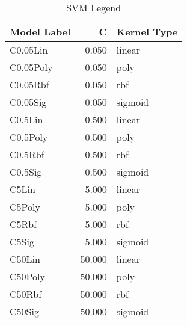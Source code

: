 \begin{table}
\centering
\caption{SVM Legend}
\label{tab:SVM_legend}
\begin{tabular}{lrl}
\toprule
Model Label & C & Kernel Type \\
\midrule
C0.05Lin & 0.050 & linear \\
C0.05Poly & 0.050 & poly \\
C0.05Rbf & 0.050 & rbf \\
C0.05Sig & 0.050 & sigmoid \\
C0.5Lin & 0.500 & linear \\
C0.5Poly & 0.500 & poly \\
C0.5Rbf & 0.500 & rbf \\
C0.5Sig & 0.500 & sigmoid \\
C5Lin & 5.000 & linear \\
C5Poly & 5.000 & poly \\
C5Rbf & 5.000 & rbf \\
C5Sig & 5.000 & sigmoid \\
C50Lin & 50.000 & linear \\
C50Poly & 50.000 & poly \\
C50Rbf & 50.000 & rbf \\
C50Sig & 50.000 & sigmoid \\
\bottomrule
\end{tabular}
\end{table}
